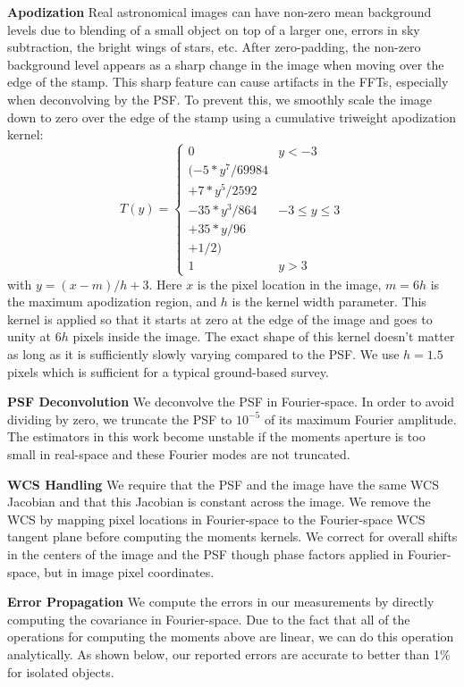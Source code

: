 \documentclass[twocolappendix, appendixfloats, numberedappendix, twocolumn, apj]{openjournal}
\begin{document}
\textbf{Apodization} Real astronomical images can have non-zero mean background levels
due to blending of a small object on top of a larger one, errors in sky subtraction,
the bright wings of stars, etc. After zero-padding, the non-zero background level appears
as a sharp change in the image when moving over the edge of the stamp. This sharp feature
can cause artifacts in the FFTs, especially when deconvolving by the PSF. To prevent this,
we smoothly scale the image down to zero over the edge of the stamp using a cumulative triweight
apodization kernel:
\begin{equation}
T(y) = \left\{
\begin{array}{cc}
0 & y < -3 \\
(-5 * y^7 / 69984 & \\
+ 7 * y^5 / 2592 & \\
- 35 * y^3 / 864 & -3 \le y \le 3 \\
+ 35 * y / 96 & \\
+ 1 / 2) &  \\
1 & y > 3
\end{array}
\right.
\end{equation}
with $y = (x-m)/h + 3$. Here $x$ is the pixel location in the image, $m=6h$ is the maximum
apodization region, and $h$ is the kernel width parameter. This kernel is applied so that it starts
at zero at the edge of the image and goes to unity at $6h$ pixels inside the image. The exact shape
of this kernel doesn't matter as long as it is sufficiently slowly varying compared to the PSF.
We use $h=1.5$ pixels which is sufficient for a typical ground-based survey.

\textbf{PSF Deconvolution} We deconvolve the PSF in Fourier-space. In order to avoid dividing by
zero, we truncate the PSF to $10^{-5}$ of its maximum Fourier amplitude. The estimators in this work
become unstable if the moments aperture is too small in real-space and these Fourier modes are not truncated.

\textbf{WCS Handling} We require that the PSF and the image have the same WCS Jacobian
and that this Jacobian is constant across the image. We remove the WCS by mapping pixel locations
in Fourier-space to the Fourier-space WCS tangent plane before computing the moments kernels.
We correct for overall shifts in the centers of the image and the PSF though phase factors applied
in Fourier-space, but in image pixel coordinates.

\textbf{Error Propagation} We compute the errors in our measurements by directly computing the
covariance in Fourier-space. Due to the fact that all of the operations for computing the moments
above are linear, we can do this operation analytically. As shown below, our reported errors are
accurate to better than 1\% for isolated objects.
\end{document}
